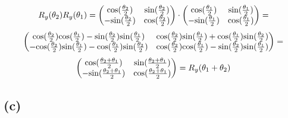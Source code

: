 \documentclass{article}
\begin{document}
$$R_y(\theta_2)R_y(\theta_1)=
\begin{pmatrix}
\textnormal{cos}(\frac{\theta_2}{2}) & \textnormal{sin}(\frac{\theta_2}{2})\\
-\textnormal{sin}(\frac{\theta_2}{2}) & \textnormal{cos}(\frac{\theta_2}{2})
\end{pmatrix}\cdot
\begin{pmatrix}
\textnormal{cos}(\frac{\theta_1}{2}) & \textnormal{sin}(\frac{\theta_1}{2})\\
-\textnormal{sin}(\frac{\theta_1}{2}) & \textnormal{cos}(\frac{\theta_1}{2})
\end{pmatrix}=
$$
$$
\begin{pmatrix}
\textnormal{cos}(\frac{\theta_2}{2})\textnormal{cos}(\frac{\theta_1}{2}) - \textnormal{sin}(\frac{\theta_2}{2})\textnormal{sin}(\frac{\theta_1}{2}) & \textnormal{cos}(\frac{\theta_2}{2})\textnormal{sin}(\frac{\theta_1}{2})+\textnormal{cos}(\frac{\theta_1}{2})\textnormal{sin}(\frac{\theta_2}{2})\\
-\textnormal{cos}(\frac{\theta_2}{2})\textnormal{sin}(\frac{\theta_1}{2})-\textnormal{cos}(\frac{\theta_1}{2})\textnormal{sin}(\frac{\theta_2}{2}) & \textnormal{cos}(\frac{\theta_2}{2})\textnormal{cos}(\frac{\theta_1}{2}) - \textnormal{sin}(\frac{\theta_2}{2})\textnormal{sin}(\frac{\theta_1}{2})
\end{pmatrix}=
$$
$$
\begin{pmatrix}
\textnormal{cos}(\frac{\theta_2+\theta_1}{2}) & \textnormal{sin}(\frac{\theta_2+\theta_1}{2})\\
-\textnormal{sin}(\frac{\theta_2+\theta_1}{2}) & \textnormal{cos}(\frac{\theta_2+\theta_1}{2})
\end{pmatrix}=
R_y(\theta_1+\theta_2)
$$

\subsection*{(c)}
\end{document}
